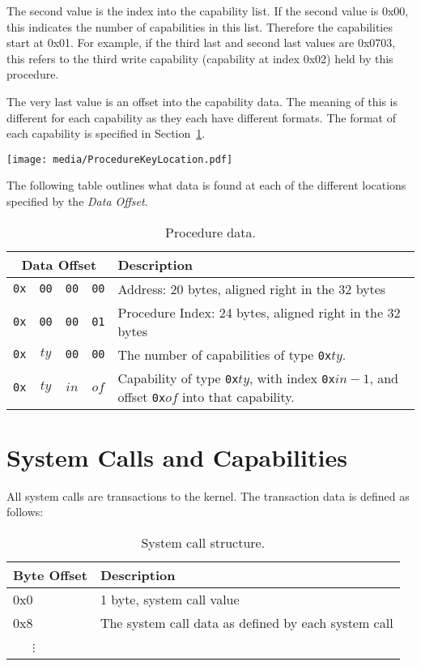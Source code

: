 \documentclass[english,a4paper]{article}
\begin{document}
The second value is the index into the capability list. If the second value is
0x00, this indicates the number of capabilities in this list. Therefore the
capabilities start at 0x01. For example, if the third last and second last
values are 0x0703, this refers to the third write capability (capability at
index 0x02) held by this procedure.

The very last value is an offset into the capability data. The meaning of this
is different for each capability as they each have different formats. The format
of each capability is specified in Section~\ref{syscalls-and-caps}.

\texttt{[image: media/ProcedureKeyLocation.pdf]}

The following table outlines what data is found at each of the different
locations specified by the \emph{Data Offset}.

\begin{table}[H]
  \caption{Procedure data.}
  \centering{}%
  \begin{tabularx}{\textwidth}{c | c | c | c | X }
    \hline
    \multicolumn{4}{c|}{Data Offset} & Description \\
    \hline
    \hline
    \texttt{0x} & \texttt{00} & \texttt{00} & \texttt{00} & Address: 20 bytes,
      aligned right in the 32 bytes \\
    \texttt{0x} & \texttt{00} & \texttt{00} & \texttt{01} & Procedure Index: 24 bytes,
      aligned right in the 32 bytes \\
    \texttt{0x} & \texttt{$ty$} & \texttt{00} & \texttt{00} & The number of
      capabilities of type \texttt{0x$ty$}. \\
    \texttt{0x} & \texttt{$ty$} & \texttt{$in$} & \texttt{$of$} & Capability of
      type \texttt{0x$ty$}, with index \texttt{0x$in-1$}, and offset
      \texttt{0x$of$} into that capability. \\
    \hline
  \end{tabularx}
\end{table}

\section{System Calls and Capabilities}\label{syscalls-and-caps}
All system calls are transactions to the kernel. The transaction data is defined
as follows:

\begin{table}[H]
  \caption{System call structure.}
  \centering{}%
  \begin{tabular}{l|p{}}
    \hline
    Byte Offset & Description\tabularnewline
    \hline
    \hline
    0x0 & 1 byte, system call value \tabularnewline
    0x8 & The system call data as defined by each system call \tabularnewline
    ~~~$\vdots$ &  \tabularnewline
    \hline
  \end{tabular}
\end{table}
\end{document}
